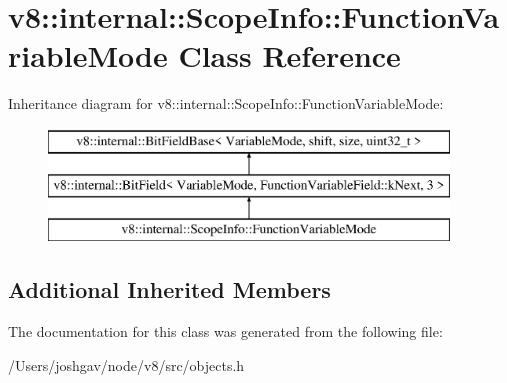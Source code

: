 \hypertarget{classv8_1_1internal_1_1_scope_info_1_1_function_variable_mode}{}\section{v8\+:\+:internal\+:\+:Scope\+Info\+:\+:Function\+Variable\+Mode Class Reference}
\label{classv8_1_1internal_1_1_scope_info_1_1_function_variable_mode}
Inheritance diagram for v8\+:\+:internal\+:\+:Scope\+Info\+:\+:Function\+Variable\+Mode\+:\begin{figure}[H]
\begin{center}
\leavevmode
\includegraphics[height=3.000000cm]{classv8_1_1internal_1_1_scope_info_1_1_function_variable_mode}
\end{center}
\end{figure}
\subsection*{Additional Inherited Members}


The documentation for this class was generated from the following file\+:\begin{DoxyCompactItemize}
\item 
/\+Users/joshgav/node/v8/src/objects.\+h\end{DoxyCompactItemize}
